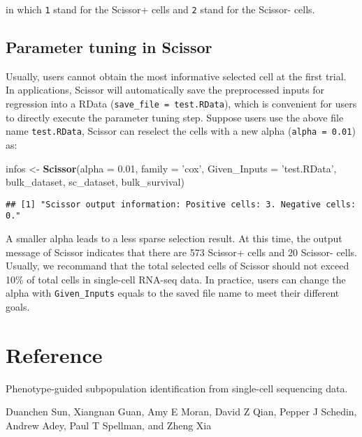 \documentclass[]{article}
\newenvironment{Shaded}{\begin{snugshade}}{\end{snugshade}}
\newcommand{\KeywordTok}[1]{\textcolor[rgb]{0.13,0.29,0.53}{\textbf{#1}}}
\newcommand{\DataTypeTok}[1]{\textcolor[rgb]{0.13,0.29,0.53}{#1}}
\newcommand{\FloatTok}[1]{\textcolor[rgb]{0.00,0.00,0.81}{#1}}
\newcommand{\StringTok}[1]{\textcolor[rgb]{0.31,0.60,0.02}{#1}}
\newcommand{\NormalTok}[1]{#1}
\begin{document}
in which \texttt{1} stand for the Scissor+ cells and \texttt{2} stand
for the Scissor- cells.

\subsection{Parameter tuning in
Scissor}\label{parameter-tuning-in-scissor}

Usually, users cannot obtain the most informative selected cell at the
first trial. In applications, Scissor will automatically save the
preprocessed inputs for regression into a RData
(\texttt{save\_file\ =\ \textquotesingle{}test.RData}), which is
convenient for users to directly execute the parameter tuning step.
Suppose users use the above file name \texttt{test.RData}, Scissor can
reselect the cells with a new alpha (\texttt{alpha\ =\ 0.01}) as:

\begin{Shaded}
\begin{Highlighting}[]
\NormalTok{infos <-}\StringTok{ }\KeywordTok{Scissor}\NormalTok{(}\DataTypeTok{alpha =} \FloatTok{0.01}\NormalTok{, }\DataTypeTok{family =} \StringTok{'cox'}\NormalTok{, }\DataTypeTok{Given_Inputs =} \StringTok{'test.RData'}\NormalTok{,}
\NormalTok{                 bulk_dataset, sc_dataset, bulk_survival)}
\end{Highlighting}
\end{Shaded}

\begin{verbatim}
## [1] "Scissor output information: Positive cells: 3. Negative cells: 0."
\end{verbatim}

A smaller alpha leads to a less sparse selection result. At this time,
the output message of Scissor indicates that there are 573 Scissor+
cells and 20 Scissor- cells. Usually, we recommand that the total
selected cells of Scissor should not exceed 10\% of total cells in
single-cell RNA-seq data. In practice, users can change the alpha with
\texttt{Given\_Inputs} equals to the saved file name to meet their
different goals.

\section{Reference}\label{reference}

Phenotype-guided subpopulation identification from single-cell
sequencing data.

Duanchen Sun, Xiangnan Guan, Amy E Moran, David Z Qian, Pepper J
Schedin, Andrew Adey, Paul T Spellman, and Zheng Xia
\end{document}
